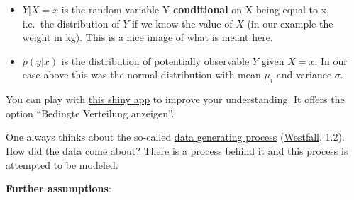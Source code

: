 \documentclass[
]{book}
\providecommand{\tightlist}{%
  \setlength{\itemsep}{0pt}\setlength{\parskip}{0pt}}
\begin{document}
\begin{itemize}
\tightlist
\item
  \(Y|X = x\) is the random variable Y \textbf{conditional} on X being equal to x, i.e.~the
  distribution of \(Y\) if we know the value of \(X\) (in our example the weight in kg).
  \href{https://blogs.sas.com/content/iml/files/2015/09/GLM_normal_identity.png}{This} is a nice image of what is meant here.
\item
  \(p(y|x)\) is the distribution of potentially observable \(Y\) given \(X = x\).
  In our case above this was the normal distribution with mean \(\mu_i\) and variance \(\sigma\).
\end{itemize}

You can play with \href{https://psychmeth.shinyapps.io/Regression-NVFehler/}{this shiny app} to improve your understanding.
It offers the option ``Bedingte Verteilung anzeigen''.

One always thinks about the so-called
\href{https://en.wikipedia.org/wiki/Data_generating_process}{data generating process}
(\href{https://www.routledge.com/Understanding-Regression-Analysis-A-Conditional-Distribution-Approach/Westfall-Arias/p/book/9780367493516?srsltid=AfmBOore3O_Ciecl0TTkr9AjPIY1d6OmbQa7o7IAdKpTSkD8s9HkwzD4}{Westfall}, 1.2).
How did the data come about? There is a process behind it and this process
is attempted to be modeled.

\textbf{Further assumptions}:
\end{document}
